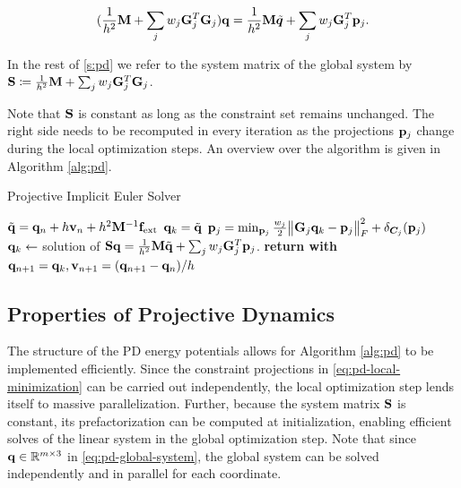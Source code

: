 \begin{equation}\label{eq:pd-global-system}
    (\frac{1}{h^2}\mathbf{M} + \sum_j w_j \mathbf{G}_j^T \mathbf{G}_j)\mathbf{q} = \frac{1}{h^2}\mathbf{M}\tilde{\bm{q}} + \sum_j w_j \mathbf{G}_j^T \mathbf{p}_j.
\end{equation}

\noindent In the rest of \cref{s:pd} we refer to the system matrix of the global system by 
$\mathbf{S} \coloneqq \frac{1}{h^2}\mathbf{M} + \sum_j w_j \mathbf{G}_j^T \mathbf{G}_j$.

Note that $\mathbf{S}$ is constant as long as the constraint set remains unchanged. The right side needs to be recomputed in every 
iteration as the projections $\mathbf{p}_j$ change during the local optimization steps.  An overview over the algorithm is given in 
Algorithm \ref{alg:pd}.

\begin{algorithm}
\caption{Projective Implicit Euler Solver}\label{alg:pd}
\begin{algorithmic}
\State $\tilde{\mathbf{q}} = \mathbf{q}_n + h\mathbf{v}_n + h^2\mathbf{M}^{-1}\mathbf{f}_{\text{ext}}$
\State $\mathbf{q}_k = \tilde{\mathbf{q}}$
\State $\mathbf{p}_j = \min_{\mathbf{p}_j} \frac{w_j}{2}\norm{\mathbf{G}_j\mathbf{q}_k - \mathbf{p}_j}^2_F + \delta_{\bm{C}_j}(\mathbf{p}_j)$
\EndFor
\State $\mathbf{q}_{k} \gets$ solution of $\mathbf{S}\mathbf{q} = \frac{1}{h^2}\mathbf{M}\tilde{\mathbf{q}} + \sum_j w_j \mathbf{G}_j^T \mathbf{p}_j$.
\EndFor
\State \textbf{return with } $\mathbf{q}_{n+1} = \mathbf{q}_k, \mathbf{v}_{n+1} = (\mathbf{q}_{n+1} - \mathbf{q}_n) / h$
\EndProcedure
\end{algorithmic}
\end{algorithm}

\subsection{Properties of Projective Dynamics}\label{ss:pd-properties}
The structure of the PD energy potentials allows for Algorithm \ref{alg:pd} to be implemented efficiently. Since the constraint projections
in \autoref{eq:pd-local-minimization} can be carried out independently, the local optimization step lends itself to massive parallelization. 
Further, because the system matrix $\mathbf{S}$ is constant, its prefactorization can be computed at initialization, enabling
efficient solves of the linear system in the global optimization step. Note that since $\mathbf{q} \in \mathbb{R}^{m \times 3}$ in \autoref{eq:pd-global-system}, 
the global system can be solved independently and in parallel for each coordinate.

